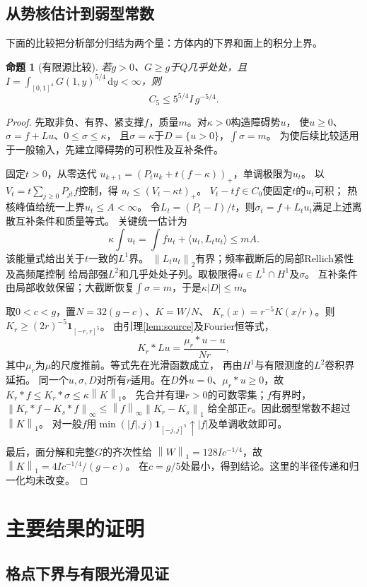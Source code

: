 \documentclass[UTF8,fontset=fandol,zihao=-4,a4paper]{ctexart}
\newtheorem{proposition}[theorem]{命题}
\newcommand{\1}{\mathbf 1}
\newcommand{\dd}{\,\mathrm d}
\newcommand{\norm}[1]{\left\lVert#1\right\rVert}
\begin{document}
\subsection{从势核估计到弱型常数}
下面的比较把分析部分归结为两个量：方体内的下界和面上的积分上界。
\begin{proposition}[有限源比较]\label{prop:transfer}
若$g>0$、$G\ge g$于$Q$几乎处处，且
$I=\int_{[0,1]^4}G(1,y)^{5/4}\dd y<\infty$，则
\[
 C_5\le5^{5/4}I\,g^{-5/4}.
\]
\end{proposition}
\begin{proof}
先取非负、有界、紧支撑$f$，质量$m$。对$\kappa>0$构造障碍势$u$，
使$u\ge0$、$\sigma=f+Lu$、$0\le\sigma\le\kappa$，
且$\sigma=\kappa$于$D=\{u>0\}$，$\int\sigma=m$。
为使后续比较适用于一般输入，先建立障碍势的可积性及互补条件。

固定$t>0$，从零迭代
$u_{k+1}=(P_tu_k+t(f-\kappa))_+$，单调极限为$u_t$。
以$V_t=t\sum_{j\ge0}P_{jt}f$控制，得
$u_t\le(V_t-\kappa t)_+$。
$V_t-tf\in C_0$使固定$t$的$u_t$可积；
热核峰值给统一上界$u_t\le A<\infty$。
令$L_t=(P_t-I)/t$，则$\sigma_t=f+L_tu_t$满足上述离散互补条件和质量等式。
关键统一估计为
\[
 \kappa\int u_t=\int fu_t+\langle u_t,L_tu_t\rangle\le mA.
\]
该能量式给出关于$t$一致的$L^1$界。
$\norm{L_tu_t}_2$有界；频率截断后的局部Rellich紧性及高频尾控制
给局部强$L^2$和几乎处处子列。取极限得$u\in L^1\cap H^1$及$\sigma$。
互补条件由局部收敛保留；大截断恢复$\int\sigma=m$，于是$\kappa|D|\le m$。

取$0<c<g$，置$N=32(g-c)$、$K=W/N$、
$K_r(x)=r^{-5}K(x/r)$。则
$K_r\ge(2r)^{-5}\1_{[-r,r]^5}$。
由引理\ref{lem:source}及Fourier恒等式，
\[
 K_r*Lu=\frac{\mu_r*u-u}{Nr},
\]
其中$\mu_r$为$\mu$的尺度推前。等式先在光滑函数成立，
再由$H^1$与有限测度的$L^2$卷积界延拓。
同一个$u,\sigma,D$对所有$r$适用。在$D$外$u=0$、$\mu_r*u\ge0$，故
$K_r*f\le K_r*\sigma\le\kappa\norm K_1$。
先合并有理$r>0$的可数零集；$f$有界时，
$\norm{K_r*f-K_s*f}_\infty\le\norm f_\infty\norm{K_r-K_s}_1$
给全部正$r$。因此弱型常数不超过$\norm K_1$。
对一般$f$用$\min(|f|,j)\1_{[-j,j]^5}\uparrow|f|$及单调收敛即可。

最后，面分解和完整$G$的齐次性给
$\norm W_1=128I c^{-1/4}$，故
$\norm K_1=4I c^{-1/4}/(g-c)$。
在$c=g/5$处最小，得到结论。这里的半径传递和归一化均未改变。
\end{proof}

\section{主要结果的证明}
\subsection{格点下界与有限光滑见证}\label{sec:lower}
\end{document}
